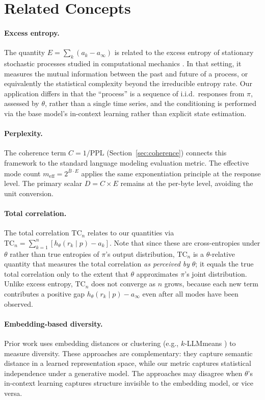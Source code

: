 \documentclass[11pt]{article}
\newcommand{\TC}{\mathrm{TC}}
\begin{document}
\section{Related Concepts}

\paragraph{Excess entropy.} The quantity $E = \sum_k (a_k - a_\infty)$ is related to the excess entropy of stationary stochastic processes studied in computational mechanics \citep{crutchfield2003regularities}. In that setting, it measures the mutual information between the past and future of a process, or equivalently the statistical complexity beyond the irreducible entropy rate. Our application differs in that the ``process'' is a sequence of i.i.d.\ responses from $\pi$, assessed by $\theta$, rather than a single time series, and the conditioning is performed via the base model's in-context learning rather than explicit state estimation.

\paragraph{Perplexity.} The coherence term $C = 1/\mathrm{PPL}$ (Section~\ref{sec:coherence}) connects this framework to the standard language modeling evaluation metric. The effective mode count $m_{\mathrm{eff}} = 2^{\bar{B} \cdot E}$ applies the same exponentiation principle at the response level. The primary scalar $D = C \times E$ remains at the per-byte level, avoiding the unit conversion.

\paragraph{Total correlation.} The total correlation $\TC_n$ relates to our quantities via $\TC_n = \sum_{k=1}^n [h_\theta(r_k \mid p) - a_k]$. Note that since these are cross-entropies under $\theta$ rather than true entropies of $\pi$'s output distribution, $\TC_n$ is a $\theta$-relative quantity that measures the total correlation \emph{as perceived by} $\theta$; it equals the true total correlation only to the extent that $\theta$ approximates $\pi$'s joint distribution. Unlike excess entropy, $\TC_n$ does not converge as $n$ grows, because each new term contributes a positive gap $h_\theta(r_k \mid p) - a_\infty$ even after all modes have been observed.

\paragraph{Embedding-based diversity.} Prior work uses embedding distances or clustering (e.g., $k$-LLMmeans \citep{lai2024llmmeans}) to measure diversity. These approaches are complementary: they capture semantic distance in a learned representation space, while our metric captures statistical independence under a generative model. The approaches may disagree when $\theta$'s in-context learning captures structure invisible to the embedding model, or vice versa.
\end{document}
